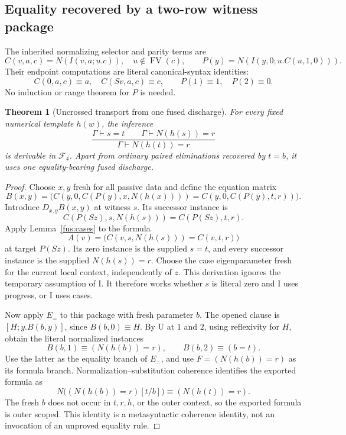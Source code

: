 \documentclass[11pt,letterpaper]{article}
\newtheorem{theorem}{Theorem}[section]
\theoremstyle{definition}\newtheorem{definition}[theorem]{Definition}
\theoremstyle{remark}\newtheorem{remark}[theorem]{Remark}
\begin{document}
\subsection{Equality recovered by a two-row witness package}

The inherited normalizing selector and parity terms are
\[
 C(v,a,c)=N(I(v,a;u.c)),\quad u\notin\operatorname{FV}(c),
 \qquad
 P(y)=N(I(y,0;u.C(u,1,0))).
\]
Their endpoint computations are literal canonical-syntax identities:
\[
 C(0,a,c)\equiv a,\quad C(Sv,a,c)\equiv c,
 \qquad P(1)\equiv1,\quad P(2)\equiv0.
\]
No induction or range theorem for $P$ is needed.

\begin{theorem}[Uncrossed transport from one fused discharge]
\label{fus:uncrossed}
For every fixed numerical template $h(w)$, the inference
\[
 \frac{\Gamma\vdash s=t\qquad\Gamma\vdash N(h(s))=r}
      {\Gamma\vdash N(h(t))=r}
\]
is derivable in $\mathcal F_4$. Apart from ordinary paired eliminations
recovered by $t=b$, it uses one equality-bearing fused discharge.
\end{theorem}
\begin{proof}
Choose $x,y$ fresh for all passive data and define the equation matrix
\[
 B(x,y)=\bigl(
 C(y,0,C(P(y),x,N(h(x))))
 =C(y,0,C(P(y),t,r))\bigr).
\]
Introduce $D_{x,y}B(x,y)$ at witness $s$. Its successor instance is
\[
 C(P(Sz),s,N(h(s)))=C(P(Sz),t,r).
\]
Apply Lemma~\ref{fus:cases} to the formula
\[
 A(v)=\bigl(C(v,s,N(h(s)))=C(v,t,r)\bigr)
\]
at target $P(Sz)$. Its zero instance is the supplied $s=t$, and every
successor instance is the supplied $N(h(s))=r$. Choose the case
eigenparameter fresh for the current local context, independently of $z$.
This derivation ignores the temporary assumption of I. It therefore works
whether $s$ is literal zero and I uses progress, or I uses cases.

Now apply $E_{=}$ to this package with fresh parameter $b$. The opened
clause is $[H;y.B(b,y)]$, since $B(b,0)\equiv H$. By U at $1$ and $2$,
using reflexivity for $H$, obtain the literal normalized instances
\[
 B(b,1)\equiv (N(h(b))=r),\qquad B(b,2)\equiv (b=t).
\]
Use the latter as the equality branch of $E_{=}$, and use
$F=(N(h(b))=r)$ as its formula branch. Normalization--substitution coherence
identifies the exported formula as
\[
 N\bigl((N(h(b))=r)[t/b]\bigr)\equiv(N(h(t))=r).
\]
The fresh $b$ does not occur in $t,r,h$, or the outer context, so the
exported formula is outer scoped. This identity is a metasyntactic
coherence identity, not an invocation of an unproved equality rule.
\end{proof}
\end{document}
